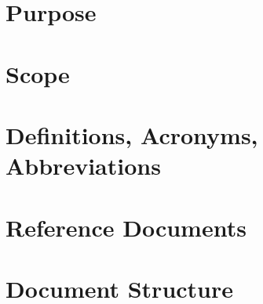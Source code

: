 \section{Purpose}
\label{sec: purpose}%


\section{Scope}
\label{sec: scope}%


\section{Definitions, Acronyms, Abbreviations}
\label{sec: definitions}%


\section{Reference Documents}
\label{sec: reference_documents}%


\section{Document Structure}
\label{sec: doc_structure}%
